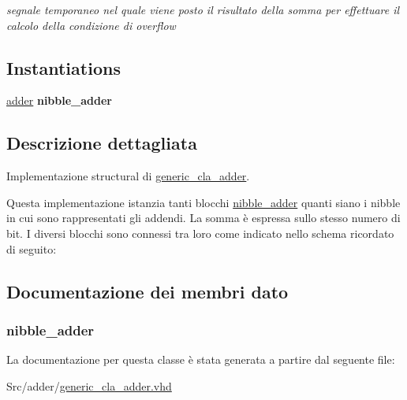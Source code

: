 \begin{DoxyCompactItemize}
\begin{DoxyCompactList}\small\item\em segnale temporaneo nel quale viene posto il risultato della somma per effettuare il calcolo della condizione di overflow \end{DoxyCompactList}\end{DoxyCompactItemize}
\subsection*{Instantiations}
 \begin{DoxyCompactItemize}
\item 
\hyperlink{classgeneric__cla__adder_1_1structural_a9d7a8a381439c61aea549e7a47ec7a6f}{adder}  {\bfseries nibble\+\_\+adder}   
\end{DoxyCompactItemize}


\subsection{Descrizione dettagliata}
Implementazione structural di \hyperlink{classgeneric__cla__adder}{generic\+\_\+cla\+\_\+adder}. 

Questa implementazione istanzia tanti blocchi \hyperlink{classnibble__adder}{nibble\+\_\+adder} quanti siano i nibble in cui sono rappresentati gli addendi. La somma è espressa sullo stesso numero di bit. I diversi blocchi sono connessi tra loro come indicato nello schema ricordato di seguito\+:  

\subsection{Documentazione dei membri dato}
\hypertarget{classgeneric__cla__adder_1_1structural_a9d7a8a381439c61aea549e7a47ec7a6f}{
\subsubsection[{adder}]{ {\bfseries \textcolor{vhdlchar}{nibble\+\_\+adder}\textcolor{vhdlchar}{ }} \hspace{0.3cm}{\ttfamily [Instantiation]}}}\label{classgeneric__cla__adder_1_1structural_a9d7a8a381439c61aea549e7a47ec7a6f}


La documentazione per questa classe è stata generata a partire dal seguente file\+:\begin{DoxyCompactItemize}
\item 
Src/adder/\hyperlink{generic__cla__adder_8vhd}{generic\+\_\+cla\+\_\+adder.\+vhd}\end{DoxyCompactItemize}
